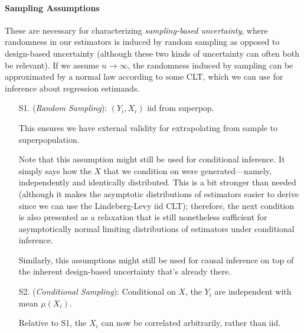 \documentclass[12pt]{article}
\theoremstyle{plain}
\theoremstyle{definition}
\theoremstyle{remark}
\newcommand{\ra}{\rightarrow}
\begin{document}
\paragraph{Sampling Assumptions}
These are necessary for characterizing
\emph{sampling-based uncertainty}, where randomness in our estimators is
induced by random sampling as opposed to design-based uncertainty
(although these two kinds of uncertainty can often both be relevant).
If we assume $n\ra\infty$, the randomness induced by sampling can be
approximated by a normal law according to some CLT, which we can use for
inference about regression estimands.
\begin{enumerate}[label=(\roman*)]
  \item[S1.]
    (\emph{Random Sampling}):
    $(Y_i,X_i)$ iid from superpop.

    This ensures we have external validity for extrapolating from sample
    to superpopulation.

    Note that this assumption might still be used for
    conditional inference.
    It simply says how the $X$ that we condition on were
    generated---namely, independently and identically distributed.
    This is a bit stronger than needed (although it makes the
    asymptotic distributions of estimators easier to derive since we can
    use the Lindeberg-Levy iid CLT); therefore, the next condition is
    also presented as a relaxation that is still nonetheless sufficient
    for asymptotically normal limiting distributions of estimators under
    conditional inference.

    Similarly, this assumptions might still be used for causal
    inference on top of the inherent design-based uncertainty that's
    already there.

  \item[S2.]
    (\emph{Conditional Sampling}):
    Conditional on $X$, the $Y_i$ are independent with
    mean $\mu(X_i)$.

    Relative to S1, the $X_i$ can now be correlated arbitrarily, rather
    than iid.

\end{enumerate}
\end{document}
